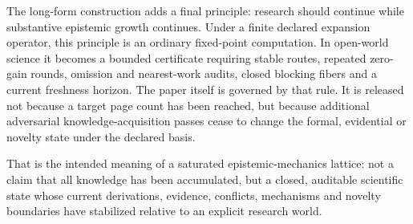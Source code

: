 The long-form construction adds a final principle: research should continue while substantive epistemic growth continues. Under a finite declared expansion operator, this principle is an ordinary fixed-point computation. In open-world science it becomes a bounded certificate requiring stable routes, repeated zero-gain rounds, omission and nearest-work audits, closed blocking fibers and a current freshness horizon. The paper itself is governed by that rule. It is released not because a target page count has been reached, but because additional adversarial knowledge-acquisition passes cease to change the formal, evidential or novelty state under the declared basis.

That is the intended meaning of a saturated epistemic-mechanics lattice: not a claim that all knowledge has been accumulated, but a closed, auditable scientific state whose current derivations, evidence, conflicts, mechanisms and novelty boundaries have stabilized relative to an explicit research world.
